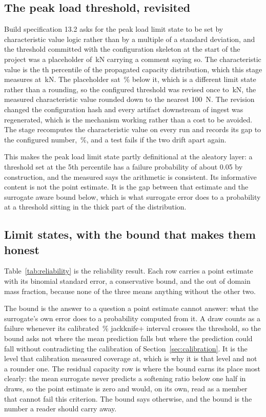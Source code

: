 \documentclass[11pt,a4paper]{article}
\begin{document}
\subsection{The peak load threshold, revisited}
\label{sec:characteristic}
Build specification 13.2 asks for the peak load limit state to be set by characteristic value
logic rather than by a multiple of a standard deviation, and the threshold committed with the
configuration skeleton at the start of the project was a placeholder of \PlaceholderPeakKN\,kN
carrying a comment saying so. The characteristic value is the \CharacteristicLevel th percentile
of the propagated capacity distribution, which this stage measures at \CharacteristicPeakKN\,kN.
The placeholder sat \PlaceholderPeakGapPct\,\% below it, which is a different limit state rather
than a rounding, so the configured threshold was revised once to \ConfiguredPeakKN\,kN, the
measured characteristic value rounded down to the nearest 100~N. The revision changed the
configuration hash and every artifact downstream of ingest was regenerated, which is the
mechanism working rather than a cost to be avoided. The stage recomputes the characteristic
value on every run and records its gap to the configured number, \CharacteristicGapPct\,\%, and
a test fails if the two drift apart again.

This makes the peak load limit state partly definitional at the aleatory layer: a threshold set
at the 5th percentile has a failure probability of about 0.05 by construction, and the measured
\PfPeak{} says the arithmetic is consistent. Its informative content is not the point estimate.
It is the gap between that estimate and the surrogate aware bound below, which is what surrogate
error does to a probability at a threshold sitting in the thick part of the distribution.

\subsection{Limit states, with the bound that makes them honest}
\label{sec:bound}
Table~\ref{tab:reliability} is the reliability result. Each row carries a point estimate with
its binomial standard error, a conservative bound, and the out of domain mass fraction, because
none of the three means anything without the other two.

The bound is the answer to a question a point estimate cannot answer: what the surrogate's own
error does to a probability computed from it. A draw counts as a failure whenever its calibrated
\MCBandLevel\,\% jackknife+ interval crosses the threshold, so the bound asks not where the mean
prediction falls but where the prediction could fall without contradicting the calibration of
Section~\ref{sec:calibration}. It is the level that calibration measured coverage at, which is
why it is that level and not a rounder one. The residual capacity row is where the bound earns
its place most clearly: the mean surrogate never predicts a softening ratio below one half in
\MCSamples{} draws, so the point estimate is zero and would, on its own, read as a member that
cannot fail this criterion. The bound says otherwise, and the bound is the number a reader
should carry away.
\end{document}
